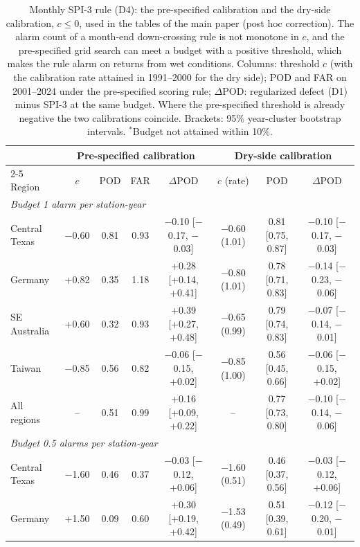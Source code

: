 \begin{table}[tbp]
\caption{Monthly SPI-3 rule (D4): the pre-specified calibration and the dry-side calibration, $c\le0$,
used in the tables of the main paper (post hoc correction). The alarm count of a month-end down-crossing
rule is not monotone in $c$, and the pre-specified grid search can meet a budget with a positive
threshold, which makes the rule alarm on returns from wet conditions. Columns: threshold $c$ (with the
calibration rate attained in 1991--2000 for the dry side); POD and FAR on 2001--2024 under the
pre-specified scoring rule; $\Delta$POD: regularized defect (D1) minus SPI-3 at the same budget. Where
the pre-specified threshold is already negative the two calibrations coincide. Brackets: 95\%
year-cluster bootstrap intervals. $^{\ast}$Budget not attained within 10\%.}
\label{tab:spithree}
\footnotesize\setlength{\tabcolsep}{0.5pt}
\begin{tabular*}{\textwidth}{@{\extracolsep\fill}lccccccc}
\toprule
& \multicolumn{4}{c}{Pre-specified calibration} & \multicolumn{3}{c}{Dry-side calibration}\\
\cmidrule{2-5}\cmidrule{6-8}
Region & $c$ & POD & FAR & $\Delta$POD & $c$ (rate) & POD & $\Delta$POD\\
\midrule
\multicolumn{8}{l}{\textit{Budget 1 alarm per station-year}}\\
Central Texas & $-$0.60 & 0.81 & 0.93 & $-$0.10 [$-$0.17, $-$0.03] & $-$0.60 (1.01) & 0.81 [0.75, 0.87] & $-$0.10 [$-$0.17, $-$0.03] \\
Germany & +0.82 & 0.35 & 1.18 & +0.28 [+0.14, +0.41] & $-$0.80 (1.01) & 0.78 [0.71, 0.83] & $-$0.14 [$-$0.23, $-$0.06] \\
SE Australia & +0.60 & 0.32 & 0.93 & +0.39 [+0.27, +0.48] & $-$0.65 (0.99) & 0.79 [0.74, 0.83] & $-$0.07 [$-$0.14, $-$0.01] \\
Taiwan & $-$0.85 & 0.56 & 0.82 & $-$0.06 [$-$0.15, +0.02] & $-$0.85 (1.00) & 0.56 [0.45, 0.66] & $-$0.06 [$-$0.15, +0.02] \\
All regions & -- & 0.51 & 0.99 & +0.16 [+0.09, +0.22] & -- & 0.77 [0.73, 0.80] & $-$0.10 [$-$0.14, $-$0.06] \\
\midrule
\multicolumn{8}{l}{\textit{Budget 0.5 alarms per station-year}}\\
Central Texas & $-$1.60 & 0.46 & 0.37 & $-$0.03 [$-$0.12, +0.06] & $-$1.60 (0.51) & 0.46 [0.37, 0.56] & $-$0.03 [$-$0.12, +0.06] \\
Germany & +1.50 & 0.09 & 0.60 & +0.30 [+0.19, +0.42] & $-$1.53 (0.49) & 0.51 [0.39, 0.61] & $-$0.12 [$-$0.20, $-$0.01] \\

\end{tabular*}
\end{table}
